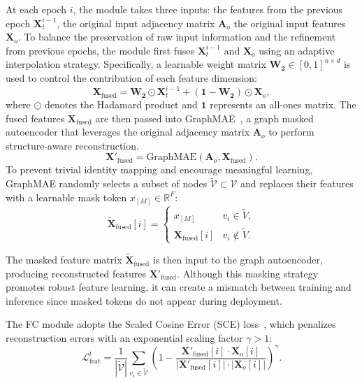 \documentclass[sigconf, anonymous, review]{acmart}
\begin{document}
      At each epoch $i$, the module takes three inputs: the features from the previous epoch $\mathbf{X}_t^{i-1}$, the original input adjacency matrix $\mathbf{A}_o$ the original input features $\mathbf{X}_o$.
      To balance the preservation of raw input information and the refinement from previous epochs, the module first fuses $\mathbf{X}_t^{i-1}$ and $\mathbf{X}_o$ using an adaptive interpolation strategy.  Specifically, a learnable weight matrix $\mathbf{W_2} \in [0,1]^{n \times d}$ is used to control the contribution of each feature dimension:
      \begin{equation}
        \mathbf{X}_{\text{fused}} = \mathbf{W_2} \odot \mathbf{X}_t^{i-1} + (\mathbf{1} - \mathbf{W_2}) \odot \mathbf{X}_o,
      \end{equation}
      where $\odot$ denotes the Hadamard product and $\mathbf{1}$ represents an all-ones matrix.
      The fused features $\mathbf{X}_{\text{fused}}$ are then passed into GraphMAE~\cite{hou2022graphmae}, a graph masked autoencoder that leverages the original adjacency matrix $\mathbf{A}_o$ to perform structure-aware reconstruction.
      \begin{equation}
        \mathbf{X}'_{\text{fused}} = \text{GraphMAE}(\mathbf{A}_o, \mathbf{X}_{\text{fused}}).
      \end{equation}
      To prevent trivial identity mapping and encourage meaningful learning, GraphMAE randomly selects a subset of nodes $\tilde{\mathcal{V}} \subset \mathcal{V}$ and replaces their features with a learnable mask token $x_{[M]} \in \mathbb{R}^F$:
      \begin{equation}
        \tilde{\mathbf{X}}_{\text{fused}}[i] =
        \begin{cases}
          x_{[M]}&v_i \in \tilde{V},\\
          \mathbf{X}_{\text{fused}}[i]& v_i \notin \tilde{V}.
        \end{cases}
      \end{equation}
      
      The masked feature matrix $\tilde{\mathbf{X}}_{\text{fused}}$ is then input to the graph autoencoder, producing reconstructed features $\mathbf{X}'_{\text{fused}}$. Although this masking strategy promotes robust feature learning, it can create a mismatch between training and inference since masked tokens do not appear during deployment.
      
      The FC module adopts the Scaled Cosine Error (SCE) loss~\cite{hou2022graphmae}, which penalizes reconstruction errors with an exponential scaling factor $\gamma > 1$:
      \begin{equation}
        \mathcal{L}^t_{\text{feat}} = \frac{1}{|\tilde{\mathcal{V}}|} \sum_{v_i \in \tilde{\mathcal{V}}} \left(1 - \frac{\mathbf{X}'_{\text{fused}}[i] \cdot \mathbf{X}_o[i]}{|\mathbf{X}'_{\text{fused}}[i]| \cdot |\mathbf{X}_o[i]|} \right)^\gamma.
      \end{equation}
\end{document}
